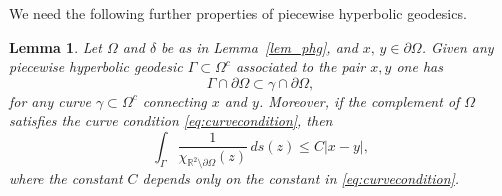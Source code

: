 \documentclass[reqno,11pt]{amsart}
\makeatletter
\def\rr{{\mathbb R}}
\def\wz{\widetilde}
\newtheorem{lem}[thm]{Lemma}%
\numberwithin{equation}{section}
\theoremstyle{remark}
\makeatother
\begin{document}


We need the following further properties of piecewise hyperbolic geodesics.


\begin{lem}\label{curve condition for geodesic}
Let $\Omega$
 and $\delta$ 
 be as in Lemma~\ref{lem_phg}, and $x,\,y\in \partial \Omega$.
Given any piecewise hyperbolic geodesic 
$\Gamma\subset \Omega^c$ associated to the pair $x,y$ one has
$$\Gamma\cap \partial\Omega\subset \gamma\cap \partial\Omega, $$
for any curve $\gamma\subset \Omega^c$ connecting $x$ 
and $y$. 
Moreover, if the complement of $\Omega$ satisfies the curve condition 
\eqref{eq:curvecondition}, then
$$  \int_\Gamma\frac{1}{\chi_{\rr^2\setminus \partial\Omega}(z)}\,ds(z) \le 
C|x-y|,$$
where the constant $C$ depends only on the constant in \eqref{eq:curvecondition}.
\end{lem}
\end{document}

